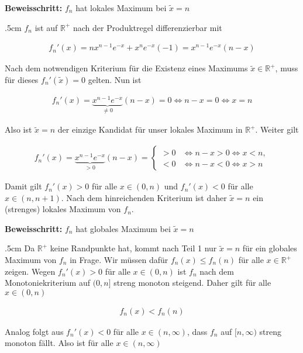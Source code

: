 \documentclass[fontsize=9pt,
               parskip=half-,
               DIV=14,
               listof=chapterentry,
               tocflat]{scrbook}
\newenvironment{indentblock}{\begin{adjustwidth}{.5cm}{}}{\end{adjustwidth}}
\newcommand{\proofstep}[1]{\textbf{\textcolor{sblau}{#1}}}
\begin{document}
\begin{solution*}
\proofstep{Beweisschritt:}
 $f_{n}$ hat lokales Maximum bei ${\tilde {x}}=n$\begin{indentblock}
$f_{n}$ ist auf $\mathbb {R} ^{+}$ nach der Produktregel differenzierbar mit

\begin{align*}
f_{n}'(x)=nx^{n-1}e^{-x}+x^{n}e^{-x}(-1)=x^{n-1}e^{-x}(n-x)
\end{align*}

Nach dem notwendigen Kriterium für die Existenz eines Maximums ${\tilde {x}}\in \mathbb {R} ^{+}$, muss für dieses $f_{n}'({\tilde {x}})=0$ gelten. Nun ist

\begin{align*}
f_{n}'(x)=\underbrace {x^{n-1}e^{-x}} _{\neq 0}(n-x)=0\iff n-x=0\iff x=n
\end{align*}

Also ist ${\tilde {x}}=n$ der einzige Kandidat für unser lokales Maximum in $\mathbb {R} ^{+}$. Weiter gilt

\begin{align*}
f_{n}'(x)=\underbrace {x^{n-1}e^{-x}} _{>0}(n-x)={\begin{cases}>0&\iff n-x>0\iff x<n,\\<0&\iff n-x<0\iff x>n\end{cases}}
\end{align*}

Damit gilt $f_{n}'(x)>0$ für alle $x\in (0,n)$ und $f_{n}'(x)<0$ für alle $x\in (n,n+1)$. Nach dem hinreichenden Kriterium ist daher ${\tilde {x}}=n$ ein (strenges) lokales Maximum von $f_{n}$.

\end{indentblock}

\proofstep{Beweisschritt:}
 $f_{n}$ hat globales Maximum bei ${\tilde {x}}=n$\begin{indentblock}
Da $\mathbb {R} ^{+}$ keine Randpunkte hat, kommt nach Teil 1 nur ${\tilde {x}}=n$ für ein globales Maximum von $f_{n}$ in Frage. Wir müssen dafür $f_{n}(x)\leq f_{n}(n)$ für alle $x\in \mathbb {R} ^{+}$ zeigen. Wegen $f_{n}'(x)>0$ für alle $x\in (0,n)$ ist $f_{n}$ nach dem Monotoniekriterium auf $(0,n]$ streng monoton steigend. Daher gilt für alle $x\in (0,n)$

\begin{align*}
f_{n}(x)<f_{n}(n)
\end{align*}

Analog folgt aus $f_{n}'(x)<0$ für alle $x\in (n,\infty )$, dass $f_{n}$ auf $[n,\infty )$ streng monoton fällt. Also ist für alle $x\in (n,\infty )$


\end{indentblock}
\end{solution*}
\end{document}
